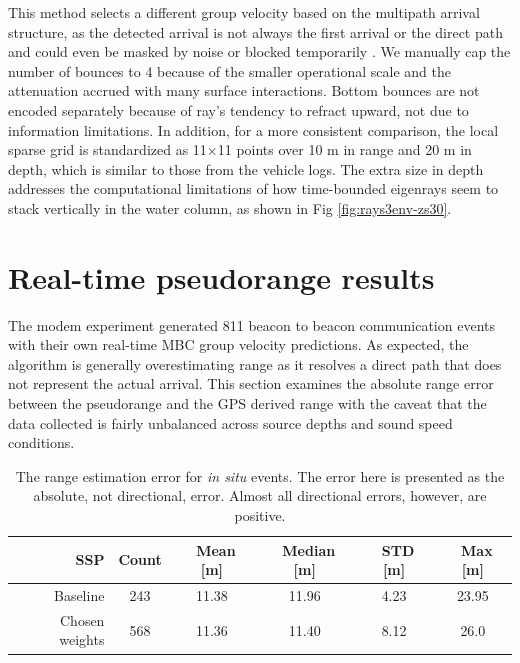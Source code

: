 This method selects a different group velocity based on the multipath arrival structure, as the detected arrival is not always the first arrival or the direct path and could even be masked by noise or blocked temporarily \citep{deffenbaugh_acoustic_1996}.
We manually cap the number of bounces to 4 because of the smaller operational scale and the attenuation accrued with many surface interactions.
Bottom bounces are not encoded separately because of ray's tendency to refract upward, not due to information limitations. 
In addition, for a more consistent comparison, the local sparse grid is standardized as 11$\times$11 points over 10 m in range and 20 m in depth, which is similar to those from the vehicle logs.
The extra size in depth addresses the computational limitations of how time-bounded eigenrays seem to stack vertically in the water column, as shown in Fig \ref{fig:rays3env-zs30}.


\FloatBarrier
\section{\label{sec:realtime} Real-time pseudorange results}

The modem experiment generated 811 beacon to beacon communication events with their own real-time MBC group velocity predictions.
As expected, the algorithm is generally overestimating range as it resolves a direct path that does not represent the actual arrival.
This section examines the absolute range error between the pseudorange and the GPS derived range with the caveat that the data collected is fairly unbalanced across source depths and sound speed conditions.

\begin{table}[h!]
\renewcommand{\arraystretch}{1.3}
\centering
\begin{tabular}{r|c|c|c|c|c}
SSP & Count & ~Mean [m] & ~Median [m] & ~STD [m] & ~Max [m] \\ \hline
Baseline & 243 & 11.38 & 11.96 & 4.23 & 23.95 \\ 
Chosen weights & 568 & 11.36 & 11.40 & 8.12 & 26.0 \\
\toprule
\end{tabular}
\caption[Range estimation error for \textit{in situ} events]{The range estimation error for \textit{in situ} events. The error here is presented as the absolute, not directional, error. Almost all directional errors, however, are positive.}
\label{tab:rangeErrorInSitu}
\end{table}

